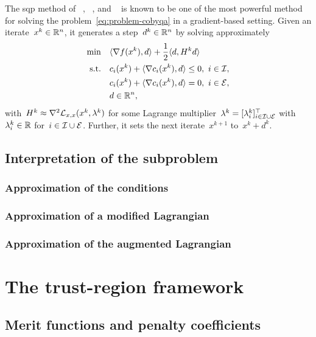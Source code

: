 The \gls{sqp} method of \citeauthor{Wilson_1963}~\cite{Wilson_1963}, \citeauthor{Han_1976}~\cite{Han_1976,Han_1977}, and \citeauthor{Powell_1978a}~\cite{Powell_1978a,Powell_1978b} is known to be one of the most powerful method for solving the problem~\cref{eq:problem-cobyqa} in a gradient-based setting.
Given an iterate~$x^k \in \mathbb{R}^n$, it generates a step~$d^k \in \mathbb{R}^n$ by solving approximately
\begin{align}
    \min        & \quad \langle\nabla f(x^k), d\rangle + \frac{1}{2} \langle d, H^k d\rangle\\
    \text{s.t.} & \quad c_{i}(x^k) + \langle\nabla c_{i}(x^k), d\rangle \le 0, ~ i \in \mathcal{I},\\
                & \quad c_{i}(x^k) + \langle\nabla c_{i}(x^k), d\rangle = 0, ~ i \in \mathcal{E},\\
                & \quad d \in \mathbb{R}^n,
\end{align}
with~$H^k \approx \nabla^2 \mathcal{L}_{x, x}(x^k, \lambda^k)$ for some Lagrange multiplier~$\lambda^k = [\lambda_i^k]_{i \in \mathcal{I} \cup \mathcal{E}}^{\top}$ with~$\lambda_i^k \in \mathbb{R}$ for~$i \in \mathcal{I} \cup \mathcal{E}$.
Further, it sets the next iterate~$x^{k + 1}$ to~$x^k + d^k$.

\subsection{Interpretation of the subproblem}

\subsubsection{Approximation of the  conditions}

\subsubsection{Approximation of a modified Lagrangian}

\subsubsection{Approximation of the augmented Lagrangian}

\section{The trust-region framework}

\subsection{Merit functions and penalty coefficients}

